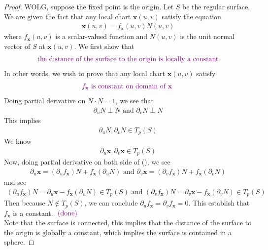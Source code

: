 \documentclass{report}
\begin{document}
\begin{proof}
WOLG, suppose the fixed point is the origin. Let $S$ be the regular surface. We are given the fact that any local chart $\textbf{x}(u,v)$ satisfy the equation 
\begin{align}
\label{lca}
\textbf{x}(u,v)=f_{\textbf{x}}(u,v)N(u,v)
\end{align}
where $f_\textbf{x}(u,v)$ is a scalar-valued function and $N(u,v)$ is the unit normal vector of $S$ at $\textbf{x}(u,v)$. We first show that 
\begin{align*}
\textcolor{violet}{\text{ the distance of the surface to the origin is locally a constant }}
\end{align*}
In other words, we wish to prove that any local chart $\textbf{x}(u,v)$ satisfy 
\begin{align*}
  \textcolor{violet}{f_\textbf{x}\text{ is constant on domain of $\textbf{x}$ }}
\end{align*}
Doing partial derivative on $N\cdot N=1$, we see that 
\begin{align*}
\partial_u N\perp N \text{ and }\partial_v N\perp N
\end{align*}
This implies 
\begin{align*}
\partial_u N, \partial _v N \in T_p(S)
\end{align*}
We know 
\begin{align*}
\partial_u \textbf{x},\partial_v \textbf{x}\in T_p(S)
\end{align*}
Now, doing partial derivative on both side of (), we see
\begin{align*}
\partial_u \textbf{x}=(\partial_u f_\textbf{x})N+f_\textbf{x}(\partial_u N)\text{ and }\partial_v \textbf{x}=(\partial_v f_\textbf{x})N+ f_\textbf{x} (\partial_v N)
\end{align*}
and see 
\begin{align*}
  (\partial_uf_\textbf{x})N=\partial_u \textbf{x}-f_\textbf{x}(\partial_u N)\in T_p(S)\text{ and }  (\partial_vf_\textbf{x})N=\partial_v \textbf{x}-f_\textbf{x}(\partial_v N)\in T_p(S)
\end{align*}
Then because $N\not\in T_p(S)$, we can conclude $\partial_uf_\textbf{x}=\partial_v f_\textbf{x}=0$. This establish that $f_\textbf{x}$ is a constant.  $\textcolor{violet}{\text{ (done) }}$\\

Note that the surface is connected, this implies that the distance of the surface to the origin is globally a constant, which implies the surface is contained in a sphere.

\end{proof}
\end{document}
